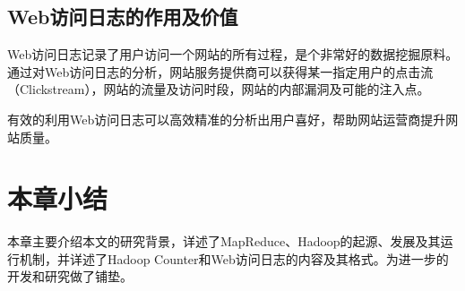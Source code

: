 \subsection{Web访问日志的作用及价值}
Web访问日志记录了用户访问一个网站的所有过程，是个非常好的数据挖掘原料。通过对Web访问日志的分析，网站服务提供商可以获得某一指定用户的点击流（Clickstream），网站的流量及访问时段，网站的内部漏洞及可能的注入点。

有效的利用Web访问日志可以高效精准的分析出用户喜好，帮助网站运营商提升网站质量。

\section{本章小结}
本章主要介绍本文的研究背景，详述了MapReduce、Hadoop的起源、发展及其运行机制，并详述了Hadoop Counter和Web访问日志的内容及其格式。为进一步的开发和研究做了铺垫。